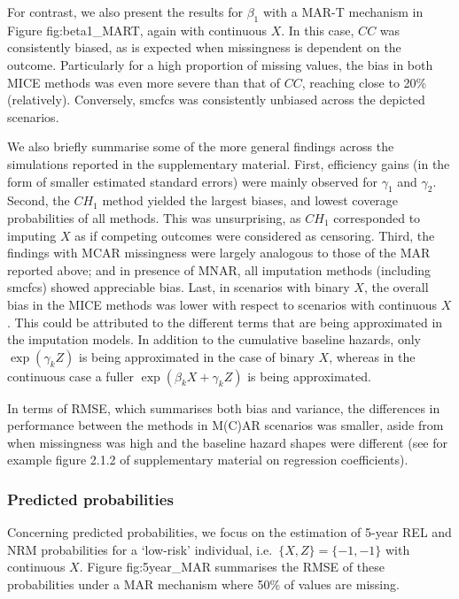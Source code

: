 \documentclass[
  letterpaper,
  DIV=11,
  numbers=noendperiod]{scrreprt}
\begin{document}
For contrast, we also present the results for \(\beta_1\) with a MAR-T
mechanism in Figure fig:beta1\_MART, again with continuous \(X\). In
this case, \(CC\) was consistently biased, as is expected when
missingness is dependent on the outcome. Particularly for a high
proportion of missing values, the bias in both MICE methods was even
more severe than that of \(CC\), reaching close to 20\% (relatively).
Conversely, smcfcs was consistently unbiased across the depicted
scenarios.

We also briefly summarise some of the more general findings across the
simulations reported in the supplementary material. First, efficiency
gains (in the form of smaller estimated standard errors) were mainly
observed for \(\gamma_1\) and \(\gamma_2\). Second, the \(CH_{1}\)
method yielded the largest biases, and lowest coverage probabilities of
all methods. This was unsurprising, as \(CH_{1}\) corresponded to
imputing \(X\) as if competing outcomes were considered as censoring.
Third, the findings with MCAR missingness were largely analogous to
those of the MAR reported above; and in presence of MNAR, all imputation
methods (including smcfcs) showed appreciable bias. Last, in scenarios
with binary \(X\), the overall bias in the MICE methods was lower with
respect to scenarios with continuous \(X\). This could be attributed to
the different terms that are being approximated in the imputation
models. In addition to the cumulative baseline hazards, only
\(\exp(\gamma_k Z)\) is being approximated in the case of binary \(X\),
whereas in the continuous case a fuller \(\exp(\beta_k X + \gamma_k Z)\)
is being approximated.

In terms of RMSE, which summarises both bias and variance, the
differences in performance between the methods in M(C)AR scenarios was
smaller, aside from when missingness was high and the baseline hazard
shapes were different (see for example figure 2.1.2 of supplementary
material on regression coefficients).

\hypertarget{predicted-probabilities-1}{%
\subsubsection{Predicted
probabilities}\label{predicted-probabilities-1}}

Concerning predicted probabilities, we focus on the estimation of 5-year
REL and NRM probabilities for a `low-risk' individual,
i.e.~\(\{X,Z\} = \{-1, -1\}\) with continuous \(X\). Figure
fig:5year\_MAR summarises the RMSE of these probabilities under a MAR
mechanism where 50\% of values are missing.
\end{document}
